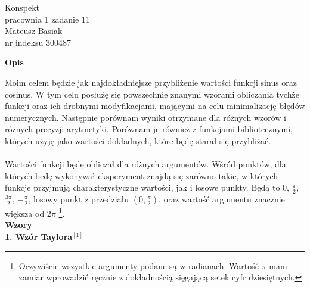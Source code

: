 \documentclass[a4paper]{article}
\begin{document}
\begin{center}
\Large
Konspekt\\
pracownia 1 zadanie 11\\

\large
Mateusz Basiak\\
nr indeksu 300487\\
\normalsize
\end{center}
\textbf{Opis}

Moim celem będzie jak najdokładniejsze przybliżenie wartości funkcji sinus oraz cosinus. W tym celu posłużę się powszechnie znanymi wzorami obliczania tychże funkcji oraz ich drobnymi modyfikacjami, mającymi na celu minimalizację błędów numerycznych. Następnie porównam wyniki otrzymane dla różnych wzorów i różnych precyzji arytmetyki. Porównam je również z funkcjami bibliotecznymi, których użyję jako wartości dokładnych, które będę starał się przybliżać.\\\\
Wartości funkcji będę obliczał dla różnych argumentów. Wśród punktów, dla których bedę wykonywał eksperyment znajdą się zarówno takie, w których funkcje przyjmują charakterystyczne wartości, jak i losowe punkty. Będą to $0$, $\frac{\pi}{2}$, $\frac{3\pi}{2}$, $-\frac{\pi}{2}$, losowy punkt z przedziału $(0,\frac{\pi}{2})$, oraz wartość argumentu znacznie większa od $2\pi$ \footnote{Oczywiście wszystkie argumenty podane są w radianach. Wartość $\pi$ mam zamiar wprowadzić ręcznie z dokładnością sięgającą setek cyfr dziesiętnych.}. \\

\textbf{Wzory}\\

\textbf{1. Wzór Taylora}$^{[1]}$
\end{document}
